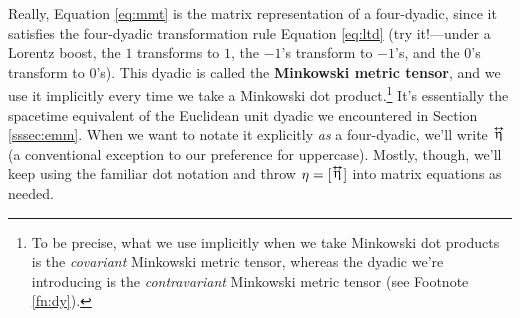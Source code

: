 \documentclass[12pt]{article}
\newcommand{\tightoverset}[2]{%
  \mathop{#2}\limits^{\vbox to -.5ex{\kern-0.75ex\hbox{$#1$}\vss}}}
\newcommand{\inlinedy}[1]{\tightoverset{\text{\tiny$\bm\leftrightarrow$}}{#1}}
\begin{document}
Really, Equation \ref{eq:mmt} is the matrix representation of a four-dyadic, since it satisfies the four-dyadic transformation rule Equation \ref{eq:ltd} (try it!---under a Lorentz boost, the $1$ transforms to $1$, the $-1$'s transform to $-1$'s, and the $0$'s transform to $0$'s). This dyadic is called the \textbf{Minkowski metric tensor}, and we use it implicitly every time we take a Minkowski dot product.\footnote{To be precise, what we use implicitly when we take Minkowski dot products is the \emph{covariant} Minkowski metric tensor, whereas the dyadic we're introducing is the \emph{contravariant} Minkowski metric tensor (see Footnote \ref{fn:dy}).} It's essentially the spacetime equivalent of the Euclidean unit dyadic we encountered in Section \ref{sssec:emm}. When we want to notate it explicitly \emph{as} a four-dyadic, we'll write $\inlinedy{\upeta}$ (a conventional exception to our preference for uppercase). Mostly, though, we'll keep using the familiar dot notation and throw $\eta = [ \mkern1mu \inlinedy{\upeta} \mkern.5mu ]$ into matrix equations as needed.
\end{document}

